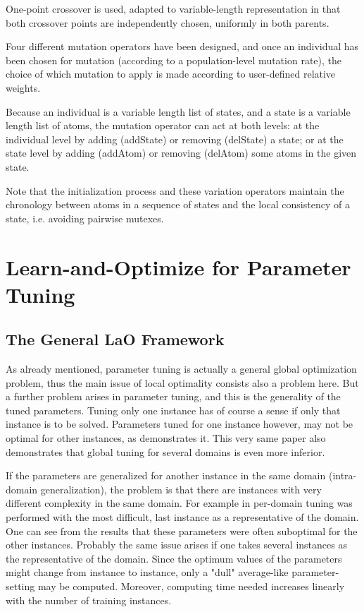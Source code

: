 \documentclass{acm_proc_article-sp}
\begin{document}
One-point crossover is used, adapted to variable-length representation in that both crossover points are independently chosen, uniformly in both parents.

Four different mutation operators have been designed, and once an individual has been chosen for mutation (according to a population-level mutation rate), the choice of which mutation to apply is made according to user-defined relative weights. 

Because an individual is a variable length list of states, and a state is a variable length list of atoms, the mutation 
operator can act at both levels: at the individual level by adding (addState) or removing (delState) 
a state; or at the state level by adding (addAtom) or removing (delAtom) some atoms in the given state. 

Note that the initialization process and these variation operators maintain the chronology between atoms in a sequence of states and the local consistency of a state, i.e. avoiding pairwise mutexes.

\section{Learn-and-Optimize for Parameter Tuning}
\label{section:LaO}

\subsection{The General LaO Framework}

As already mentioned, parameter tuning is actually a general global optimization problem, thus the main issue of local optimality consists also a problem here. But a further problem arises in parameter tuning, and this is the generality of the tuned parameters. Tuning only one instance has of course a sense if only that instance is to be solved. Parameters tuned for one instance however, may not be optimal for other instances, as \cite{BibGECCO:2010} demonstrates it. This very same paper also demonstrates that global tuning for several domains is even more inferior.

If the parameters are generalized for another instance in the same domain (intra-domain generalization), the problem is that there are instances with very different complexity in the same domain. For example in \cite{BibGECCO:2010} per-domain tuning was performed with the most difficult, last instance as a representative of the domain. One can see from the results that these parameters were often suboptimal for the other instances. Probably the same issue arises if one takes several instances as the representative of the domain. Since the optimum values of the parameters might change from instance to instance, only a "dull" average-like parameter-setting may be computed. Moreover, computing time needed increases linearly with the number of training instances. 
\end{document}

